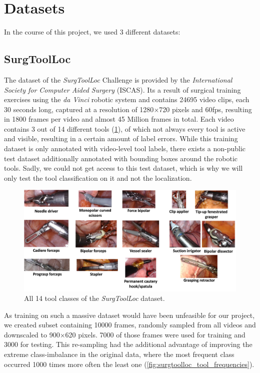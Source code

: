 \section{Datasets}

In the course of this project, we used 3 different datasets:

\subsection{SurgToolLoc}
The dataset of the \emph{SurgToolLoc} Challenge is provided by the \emph{International Society for Computer Aided Surgery} (ISCAS). Its a result of surgical training exercises using the \emph{da Vinci} robotic system and contains \num{24695} video clips, each 30 seconds long, captured at a resolution of 1280$\times$720 pixels and 60fps, resulting in 1800 frames per video and almost 45 Million frames in total. Each video contains 3 out of 14 different tools (\ref{fig:surgtoolloc_tools}), of which not always every tool is active and visible, resulting in a certain amount of label errors. While this training dataset is only annotated with video-level tool labels, there exists a non-public test dataset additionally annotated with bounding boxes around the robotic tools. Sadly, we could not get access to this test dataset, which is why we will only test the tool classification on it and not the localization.

\begin{figure}[h]
	\centering
	\includegraphics[width=15cm]{4_experiments/images/surgtoolloc_tools.png}
	\caption{All 14 tool classes of the \emph{SurgToolLoc} dataset.}
	\label{fig:surgtoolloc_tools}
\end{figure}

As training on such a massive dataset would have been unfeasible for our project, we created subset containing \num{10000} frames, randomly sampled from all videos and downscaled to 900$\times$620 pixels. \num{7000} of those frames were used for training and \num{3000} for testing. This re-sampling had the additional advantage of improving the extreme class-imbalance in the original data, where the most frequent class occurred \num{1000} times more often the least one (\ref{fig:surgtoolloc_tool_frequencies}).

